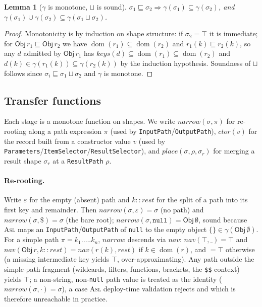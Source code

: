 \documentclass[11pt]{article}
\newcommand{\asl}{\textsc{Asl}}
\newcommand{\dom}{\operatorname{dom}}
\newcommand{\Obj}{\mathsf{Obj}}
\newcommand{\narrow}{\mathit{narrow}}
\newcommand{\place}{\mathit{place}}
\theoremstyle{plain}
\newtheorem{lemma}{Lemma}
\theoremstyle{definition}
\theoremstyle{remark}
\begin{document}
\begin{lemma}[$\gamma$ is monotone, $\sqcup$ is sound]\label{lem:join}
$\sigma_1\sqsubseteq\sigma_2\Rightarrow\gamma(\sigma_1)\subseteq\gamma(\sigma_2)$, and
$\gamma(\sigma_1)\cup\gamma(\sigma_2)\subseteq\gamma(\sigma_1\sqcup\sigma_2)$.
\end{lemma}
\begin{proof}
Monotonicity is by induction on shape structure: if $\sigma_2=\top$ it is immediate; for
$\Obj\,r_1\sqsubseteq\Obj\,r_2$ we have $\dom(r_1)\subseteq\dom(r_2)$ and
$r_1(k)\sqsubseteq r_2(k)$, so any $d$ admitted by $\Obj\,r_1$ has $\mathit{keys}(d)\subseteq
\dom(r_1)\subseteq\dom(r_2)$ and $d(k)\in\gamma(r_1(k))\subseteq\gamma(r_2(k))$ by the
induction hypothesis. Soundness of $\sqcup$ follows since
$\sigma_i\sqsubseteq\sigma_1\sqcup\sigma_2$ and $\gamma$ is monotone.
\end{proof}

\subsection{Transfer functions}

Each stage is a monotone function on shapes. We write $\narrow(\sigma,\pi)$ for re-rooting
along a path expression $\pi$ (used by \texttt{InputPath}/\texttt{OutputPath}),
$\mathit{ctor}(v)$ for the record built from a constructor value $v$ (used by
\texttt{Parameters}/\texttt{ItemSelector}/\texttt{ResultSelector}), and
$\place(\sigma,\rho,\sigma_r)$ for merging a result shape $\sigma_r$ at a
\texttt{ResultPath} $\rho$.

\paragraph{Re-rooting.}
Write $\varepsilon$ for the empty (absent) path and $k\!::\!\mathit{rest}$ for the split of a
path into its first key and remainder. Then $\narrow(\sigma,\varepsilon)=\sigma$ (no path) and
$\narrow(\sigma,\$)=\sigma$ (the bare root); $\narrow(\sigma,\texttt{null})=\Obj\,\emptyset$,
sound because \asl{} maps an \texttt{InputPath}/\texttt{OutputPath} of \texttt{null} to the
empty object $\{\}\in\gamma(\Obj\,\emptyset)$. For a simple path $\pi=k_1.\dots.k_n$, $\narrow$
descends via $\mathit{nav}$: $\mathit{nav}(\top,\_)=\top$ and
$\mathit{nav}(\Obj\,r,k\!::\!\mathit{rest})=\mathit{nav}(r(k),\mathit{rest})$ if $k\in\dom(r)$,
and $=\top$ otherwise (a missing intermediate key yields $\top$, over-approximating). Any path
outside the simple-path fragment (wildcards, filters, functions, brackets, the \texttt{\$\$}
context) yields $\top$; a non-string, non-\texttt{null} path value is treated as the identity
($\narrow(\sigma,\cdot)=\sigma$), a case \asl{} deploy-time validation rejects and which is
therefore unreachable in practice.
\end{document}
